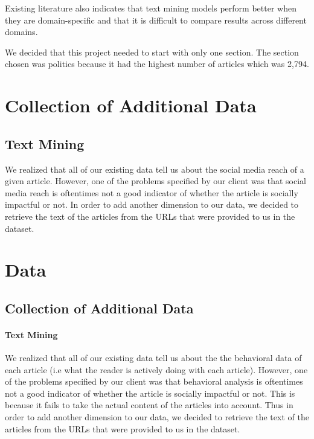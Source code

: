 \documentclass[10pt,letterpaper]{article}
\begin{document}
Existing literature also indicates that text mining models perform
better when they are domain-specific and that it is difficult to compare
results across different domains.

We decided that this project needed to start with only one section. The
section chosen was politics because it had the highest number of
articles which was 2,794.


\section{Collection of Additional
Data}\label{collection-of-additional-data}

\subsection{Text Mining}\label{text-mining}

We realized that all of our existing data tell us about the social media
reach of a given article. However, one of the problems specified by our
client was that social media reach is oftentimes not a good indicator of
whether the article is socially impactful or not. In order to add
another dimension to our data, we decided to retrieve the text of the
articles from the URLs that were provided to us in the dataset.

\hypertarget{data}{%
\section{Data}\label{data}}

\hypertarget{collection-of-additional-data}{%
\subsection{Collection of Additional
Data}\label{collection-of-additional-data}}

\hypertarget{text-mining}{%
\paragraph{Text Mining}\label{text-mining}}

We realized that all of our existing data tell us about the the
behavioral data of each article (i.e what the reader is actively doing
with each article). However, one of the problems specified by our client
was that behavioral analysis is oftentimes not a good indicator of
whether the article is socially impactful or not. This is because it
fails to take the actual content of the articles into account. Thus in
order to add another dimension to our data, we decided to retrieve the
text of the articles from the URLs that were provided to us in the
dataset.
\end{document}
